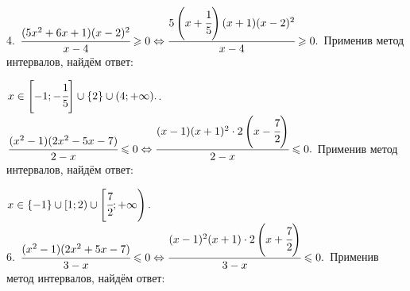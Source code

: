 \documentclass[12pt]{article}
\begin{document}
4. $\cfrac{(5x^2+6x+1)(x-2)^2}{x-4}\geqslant0\Leftrightarrow\cfrac{5\left(x+\cfrac{1}{5}\right)(x+1)(x-2)^2}{x-4}\geqslant0.$ Применив метод интервалов, найдём ответ:
\begin{figure}[ht!]
\end{figure}
$x\in\left[-1;-\cfrac{1}{5}\right]\cup\{2\}\cup(4;+\infty).$\newpage{}. $\cfrac{(x^2-1)(2x^2-5x-7)}{2-x}\leqslant0\Leftrightarrow\cfrac{(x-1)(x+1)^2\cdot 2\left(x-\cfrac{7}{2}\right)}{2-x}\leqslant0.$ Применив метод интервалов, найдём ответ:
\begin{figure}[ht!]
\end{figure}
$x\in\{-1\}\cup[1;2)\cup\left[\cfrac{7}{2};+\infty\right).$\\
6. $\cfrac{(x^2-1)(2x^2+5x-7)}{3-x}\leqslant0\Leftrightarrow\cfrac{(x-1)^2(x+1)\cdot 2\left(x+\cfrac{7}{2}\right)}{3-x}\leqslant0.$ Применив метод интервалов, найдём ответ:
\begin{figure}[ht!]
\end{figure}
\end{document}
